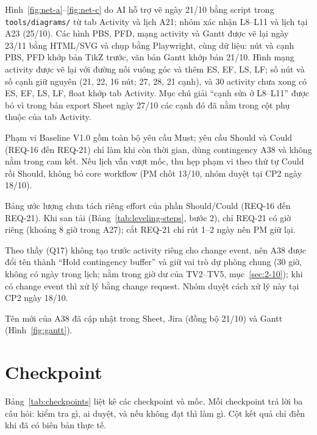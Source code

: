 Hình~\ref{fig:net-a}--\ref{fig:net-c} do AI hỗ trợ vẽ ngày 21/10 bằng script trong \texttt{tools/diagrams/} từ tab Activity và lịch A21; nhóm xác nhận L8--L11 và lịch tại A23 (25/10). Các hình PBS, PFD, mạng activity và Gantt được vẽ lại ngày 23/11 bằng HTML/SVG và chụp bằng Playwright, cùng dữ liệu: nút và cạnh PBS, PFD khớp bản TikZ trước, văn bản Gantt khớp bản 21/10. Hình mạng activity được vẽ lại với đường nối vuông góc và thêm ES, EF, LS, LF; số nút và số cạnh giữ nguyên (21, 22, 16 nút; 27, 28, 21 cạnh), và 30 activity chưa xong có ES, EF, LS, LF, float khớp tab Activity. Mục chú giải \enquote{cạnh sửa ở L8--L11} được bỏ vì trong bản export Sheet ngày 27/10 các cạnh đó đã nằm trong cột phụ thuộc của tab Activity.

Phạm vi Baseline V1.0 gồm toàn bộ yêu cầu Must; yêu cầu Should và Could (REQ-16 đến REQ-21) chỉ làm khi còn thời gian, dùng contingency A38 và không nằm trong cam kết. Nếu lịch vẫn vượt mốc, thu hẹp phạm vi theo thứ tự Could rồi Should, không bỏ core workflow (PM chốt 13/10, nhóm duyệt tại CP2 ngày 18/10).

Bảng ước lượng chưa tách riêng effort của phần Should/Could (REQ-16 đến REQ-21). Khi san tải (Bảng~\ref{tab:leveling-steps}, bước 2), chỉ REQ-21 có giờ riêng (khoảng 8 giờ trong A27); cắt REQ-21 chỉ rút 1--2 ngày nên PM giữ lại.

Theo thầy (Q17) không tạo trước activity riêng cho change event, nên A38 được đổi tên thành \enquote{Hold contingency buffer} và giữ vai trò dự phòng chung (30 giờ, không có ngày trong lịch; nằm trong giờ dư của TV2--TV5, mục~\ref{sec:2-10}); khi có change event thì xử lý bằng change request. Nhóm duyệt cách xử lý này tại CP2 ngày 18/10.

Tên mới của A38 đã cập nhật trong Sheet, Jira (đồng bộ 21/10) và Gantt (Hình~\ref{fig:gantt}).

\section{Checkpoint}
\label{sec:2-5}
Bảng~\ref{tab:checkpoints} liệt kê các checkpoint và mốc. Mỗi checkpoint trả lời ba câu hỏi: kiểm tra gì, ai duyệt, và nếu không đạt thì làm gì. Cột kết quả chỉ điền khi đã có biên bản thực tế.

